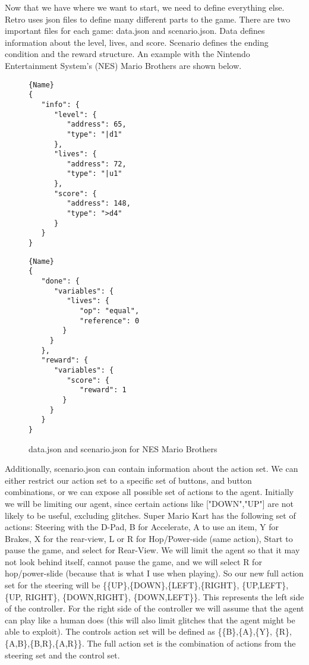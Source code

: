 \documentclass[12pt,letter]{article}
\begin{document}
Now that we have where we want to start, we need to define everything else.  
Retro uses json files to define many different parts to the game. There are 
two important files for each game: data.json and scenario.json. Data defines
information about the level, lives, and score. Scenario defines the
ending condition and the reward structure. An example with the Nintendo
Entertainment System's (NES) Mario Brothers are shown below.
\\
\begin{figure}[h!]
\begin{minipage}{0.45\textwidth}
    \begin{lstlisting}[caption=data.json, frame=tlrb]{Name}
{
   "info": {
      "level": {
         "address": 65,
         "type": "|d1"
      },
      "lives": {
         "address": 72,
         "type": "|u1"
      },
      "score": {
         "address": 148,
         "type": ">d4"
      }
   }
}
    \end{lstlisting}
\end{minipage}\hfill
\begin{minipage}{0.45\textwidth}
    \begin{lstlisting}[caption=scenario.json, frame=tlrb]{Name}
{
   "done": {
      "variables": {
         "lives": {
            "op": "equal",
            "reference": 0
        }
     }
   },
   "reward": {
      "variables": {
         "score": {
            "reward": 1
        }
     }
   }
}
    \end{lstlisting}
\end{minipage}
    \caption{data.json and scenario.json for NES Mario Brothers}
\end{figure}
Additionally, scenario.json can contain information about the action set. We can
either restrict our action set to a specific set of buttons, and button 
combinations, or we can expose all possible set of actions to the agent. Initially
we will be limiting our agent, since certain actions like ["DOWN","UP"] are
not likely to be useful, excluding glitches. Super Mario Kart has the following
set of actions: Steering with the D-Pad, B for Accelerate, A to use an item, 
Y for Brakes, X for the rear-view, L or R for Hop/Power-side (same action), 
Start to pause the game, and select for Rear-View. We will limit the agent
so that it may not look behind itself, cannot pause the game, and we will select
R for hop/power-slide (because that is what I use when playing). So our new full
action set for the steering will be \{\{UP\},\{DOWN\},\{LEFT\},\{RIGHT\},
\{UP,LEFT\}, \{UP, RIGHT\}, \{DOWN,RIGHT\}, \{DOWN,LEFT\}\}. 
This represents the left side of the controller. For the right side of the 
controller we will assume that the agent can play like a human does 
(this will also limit glitches that the agent might be able to exploit). 
The controls action set will be defined as \{\{B\},\{A\},\{Y\},
\{R\},\{A,B\},\{B,R\},\{A,R\}\}. The full action set is the combination of 
actions from the steering set and the control set. 
\end{document}
